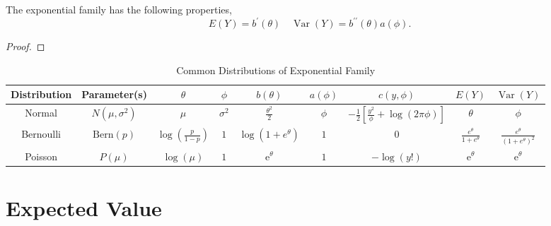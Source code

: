 \begin{property}
	The exponential family has the following properties,
	\begin{equation*}
		E(Y)=b^{\prime}(\theta)\quad\operatorname{Var}(Y)=b^{\prime\prime}(\theta)a(\phi).
	\end{equation*}
\end{property}

\begin{proof}

\end{proof}

\begin{landscape}
	\begin{table}[hpt]
		\centering
		\caption{Common Distributions of Exponential Family}
		\begin{tabular}{ccccccccc}
			\toprule
			Distribution & Parameter(s)      & $\theta$                         & $\phi$       & $b(\theta)$                     & $a(\phi)$ & $c(y,\phi)$                                                   & $E(Y)$                            & $\operatorname{Var}(Y)$                            \\
			\midrule
			Normal       & $N(\mu,\sigma^2)$ & $\mu$                            & $\sigma^{2}$ & $\frac{\theta^{2}}{2}$          & $\phi$    & $-\frac{1}{2}\left[\frac{y^{2}}{\phi}+\log (2\pi\phi)\right]$ & $\theta$                          & $\phi$                                             \\
			Bernoulli    & $\text{Bern}(p)$  & $\log\left(\frac{p}{1-p}\right)$ & $1$          & $\log\left(1+e^{\theta}\right)$ & $1$       & $0$                                                           & $\frac{e^{\theta}}{1+e^{\theta}}$ & $\frac{e^{\theta}}{\left(1+e^{\theta}\right)^{2}}$ \\
			Poisson      & $P(\mu)$          & $\log(\mu)$                      & $1$          & $\mathrm{e}^{\theta}$           & $1$       & $-\log(y!)$                                                   & $\mathrm{e}^{\theta}$             & $\mathrm{e}^{\theta}$                              \\
			\bottomrule
		\end{tabular}
	\end{table}
\end{landscape}

\section{Expected Value}

